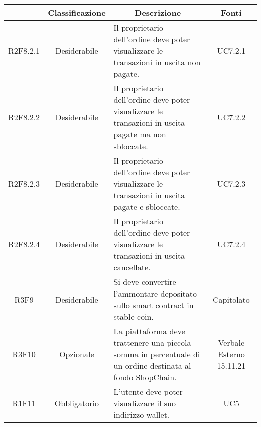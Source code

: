 \begin{table}[H]
    \centering
    \renewcommand{\arraystretch}{1.8}
    \begin{tabular}{c | c | p{6cm} | c}
        \rowcolor[HTML]{125E28}
        \multicolumn{1}{c}{\color[HTML]{FFFFFF} \textbf{Codice}}          &
        \multicolumn{1}{c}{\color[HTML]{FFFFFF} \textbf{Classificazione}} &
        \multicolumn{1}{c}{\color[HTML]{FFFFFF} \textbf{Descrizione}}     &
        \multicolumn{1}{c}{\color[HTML]{FFFFFF} \textbf{Fonti}}                                                                                                                                                                  \\
        \hline
        R2F8.2.1                                                          & Desiderabile & Il proprietario dell'ordine deve poter visualizzare le transazioni in uscita non pagate.                   & UC7.2.1                  \\
        R2F8.2.2                                                          & Desiderabile & Il proprietario dell'ordine deve poter visualizzare le transazioni in uscita pagate ma non sbloccate.      & UC7.2.2                  \\
        R2F8.2.3                                                          & Desiderabile & Il proprietario dell'ordine deve poter visualizzare le transazioni in uscita pagate e sbloccate.           & UC7.2.3                  \\
        R2F8.2.4                                                          & Desiderabile & Il proprietario dell'ordine deve poter visualizzare le transazioni in uscita cancellate.                   & UC7.2.4                  \\
        R3F9                                                              & Desiderabile & Si deve convertire l'ammontare depositato sullo smart contract\glo{} in stable coin\glo{}.                 & Capitolato               \\
        R3F10                                                             & Opzionale    & La piattaforma deve trattenere una piccola somma in percentuale di un ordine destinata al fondo ShopChain. & Verbale Esterno 15.11.21 \\
        R1F11                                                             & Obbligatorio & L'utente deve poter visualizzare il suo indirizzo wallet\glo{}.                                            & UC5                      \\

\end{tabular}
\end{table}
